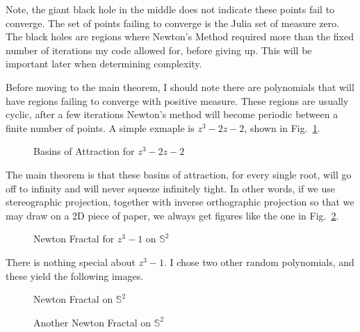 \documentclass{article}
\begin{document}
        Note, the giant black hole in the middle does not indicate these points fail to converge.
        The set of points failing to converge is the Julia set of measure zero. The black
        holes are regions where Newton's Method required more than the fixed number of iterations
        my code allowed for, before giving up. This will be important later when determining
        complexity.
        \par\hfill\par
        Before moving to the main theorem, I should note there are polynomials that will have
        regions failing to converge with positive measure. These regions are usually cyclic,
        after a few iterations Newton's method will become periodic between a finite number of
        points. A simple exmaple is $z^{3}-2z-2$, shown in Fig.~\ref{fig:z3_minus_2z_minus_2}.
        \begin{figure}[H]
            \centering
            \caption{Basins of Attraction for $z^{3}-2z-2$}
            \label{fig:z3_minus_2z_minus_2}
        \end{figure}
        The main theorem is that these basins of attraction, for every single root, will
        go off to infinity and will never squeeze infinitely tight. In other words,
        if we use stereographic projection, together with inverse orthographic projection so
        that we may draw on a 2D piece of paper, we always get figures like the one in
        Fig.~\ref{fig:z2_minus_1_on_sphere}.
        \begin{figure}[H]
            \centering
            \caption{Newton Fractal for $z^{3}-1$ on $\mathbb{S}^{2}$}
            \label{fig:z2_minus_1_on_sphere}
        \end{figure}
        There is nothing special about $z^{3}-1$. I chose two other random polynomials,
        and these yield the following images.
        \begin{figure}[H]
            \centering
            \caption{Newton Fractal on $\mathbb{S}^{2}$}
            \label{fig:newton_fractal_on_sphere}
        \end{figure}
        \begin{figure}[H]
            \centering
            \caption{Another Newton Fractal on $\mathbb{S}^{2}$}
            \label{fig:another_newton_fractal_on_sphere}
        \end{figure}
\end{document}
